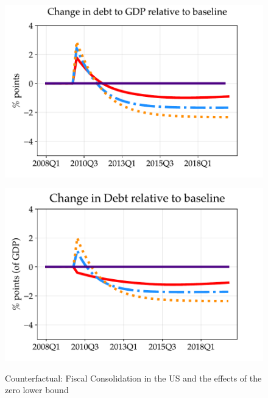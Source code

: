 \begin{figure}[t!]
\medskip
\begin{minipage}{0.51\textwidth}
\includegraphics[scale=.57]{text/chapter1/Figures/Fiscal_Consolidation_CounterFactual/change_in_debt2GDP_CounterFactual_Fiscal_Consolidation_no_ZLB}
\label{fig:c}
\end{minipage}\hspace*{\fill}
\begin{minipage}{0.51\textwidth}
\includegraphics[scale=.57]{text/chapter1/Figures/Fiscal_Consolidation_CounterFactual/change_in_debt_CounterFactual_Fiscal_Consolidation_no_ZLB}
 \label{fig:d}
\end{minipage}


\caption{Counterfactual: Fiscal Consolidation in the US and the effects of the zero lower bound}
\label{FC_US_no_ZLB}
\end{figure}






